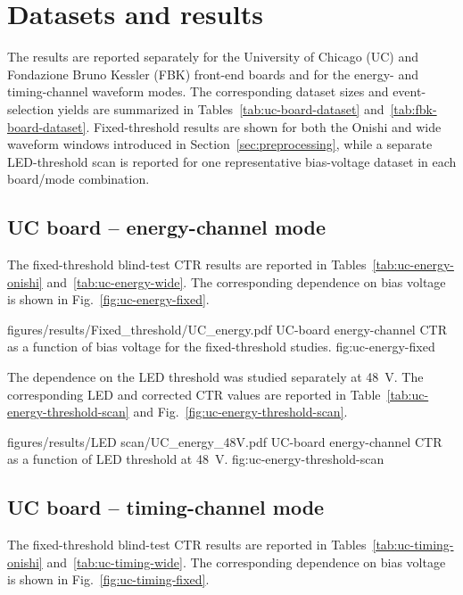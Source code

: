 \section{Datasets and results}

The results are reported separately for the University of Chicago (UC) and Fondazione Bruno Kessler (FBK) front-end boards and for the energy- and timing-channel waveform modes. The corresponding dataset sizes and event-selection yields are summarized in Tables~\ref{tab:uc-board-dataset} and~\ref{tab:fbk-board-dataset}. Fixed-threshold results are shown for both the Onishi and wide waveform windows introduced in Section~\ref{sec:preprocessing}, while a separate LED-threshold scan is reported for one representative bias-voltage dataset in each board/mode combination.

\subsection{UC board -- energy-channel mode}

The fixed-threshold blind-test CTR results are reported in Tables~\ref{tab:uc-energy-onishi} and~\ref{tab:uc-energy-wide}. The corresponding dependence on bias voltage is shown in Fig.~\ref{fig:uc-energy-fixed}.





\reportfigure
    {figures/results/Fixed_threshold/UC_energy.pdf}
    {UC-board energy-channel CTR as a function of bias voltage for the fixed-threshold studies.}
    {fig:uc-energy-fixed}

The dependence on the LED threshold was studied separately at \SI{48}{V}. The corresponding LED and corrected CTR values are reported in Table~\ref{tab:uc-energy-threshold-scan} and Fig.~\ref{fig:uc-energy-threshold-scan}.



\reportfigure
    {figures/results/LED scan/UC_energy_48V.pdf}
    {UC-board energy-channel CTR as a function of LED threshold at \SI{48}{V}.}
    {fig:uc-energy-threshold-scan}


\subsection{UC board -- timing-channel mode}

The fixed-threshold blind-test CTR results are reported in Tables~\ref{tab:uc-timing-onishi} and~\ref{tab:uc-timing-wide}. The corresponding dependence on bias voltage is shown in Fig.~\ref{fig:uc-timing-fixed}.

